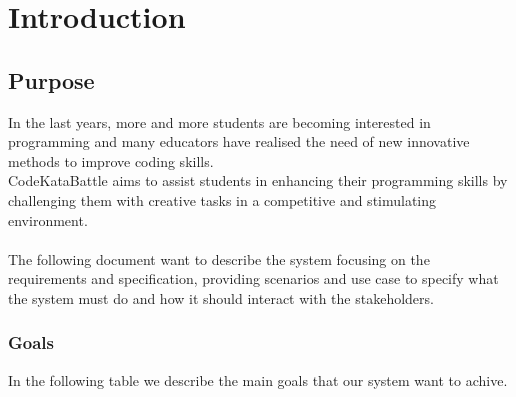 \chapter{Introduction}

\section{Purpose}
In the last years, more and more students are becoming interested in programming and many educators have realised 
the need of new innovative methods to improve coding skills. \\
CodeKataBattle aims to assist students in enhancing their programming skills by challenging them with creative tasks
 in a competitive and stimulating environment. \\
 \\
 The following document want to describe the system focusing on the requirements and specification, providing scenarios 
 and use case to specify what the system must do and how it should interact with the stakeholders.\\  

 \subsection{Goals}
 In the following table we describe the main goals that our system want to achive.\\
 \begin{table}[H]
    \centering
    \end{table}
    \clearpage
